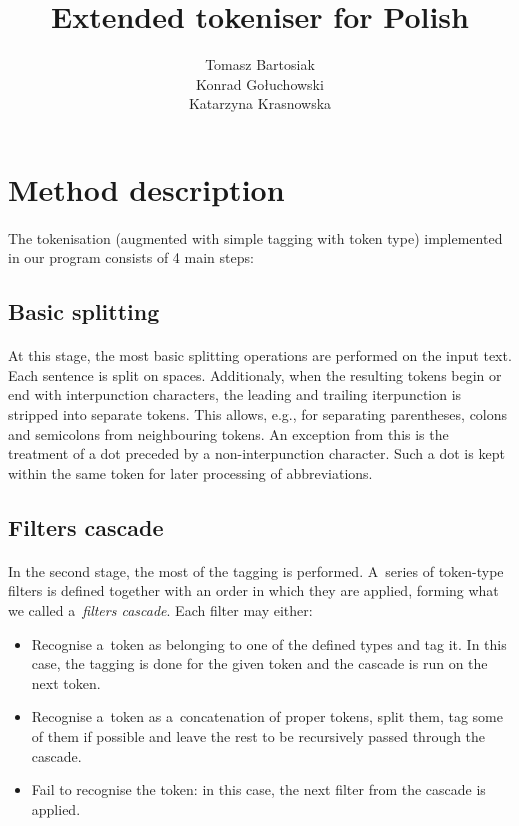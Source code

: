 \documentclass[oneside,12pt]{article}
\title{Extended tokeniser for Polish}
\author{Tomasz Bartosiak \\ Konrad Gołuchowski \\ Katarzyna Krasnowska}
\begin{document}
\maketitle

\section{Method description}

\paragraph{}
The tokenisation (augmented with simple tagging with token type) implemented in our program consists of 4 main steps:

\subsection{Basic splitting}

\paragraph{}
At this stage, the most basic splitting operations are performed on the input text. Each sentence is split on spaces. Additionaly, when the resulting tokens begin or end with interpunction characters, the leading and trailing iterpunction is stripped into separate tokens. This allows, e.g., for separating parentheses, colons and semicolons from neighbouring tokens. An exception from this is the treatment of a dot preceded by a non-interpunction character. Such a dot is kept within the same token for later processing of abbreviations.

\subsection{Filters cascade}

\paragraph{}
In the second stage, the most of the tagging is performed. A~series of token-type filters is defined together with an order in which they are applied, forming what we called a~\textit{filters cascade}. Each filter may either:
    \begin{itemize}
        \item Recognise a~token as belonging to one of the defined types and tag it. In this case, the tagging is done for the given token and the cascade is run on the next token.
        \item Recognise a~token as a~concatenation of proper tokens, split them, tag some of them if possible and leave the rest to be recursively passed through the cascade.
        \item Fail to recognise the token: in this case, the next filter from the cascade is applied.
    \end{itemize}
\end{document}
